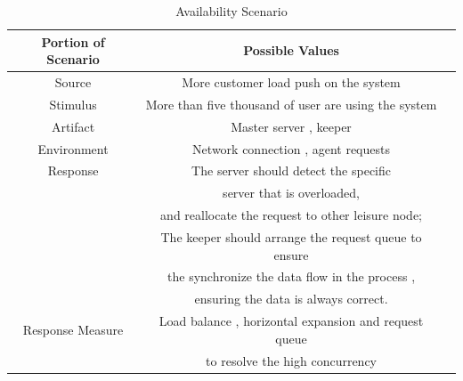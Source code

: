 \documentclass{article}
\begin{document}
	\begin{center}
		\begin{table}[!htb]
		\begin{tabular}{ccc}
		\toprule  
		Portion of Scenario & Possible Values\\
		\midrule 
		Source 				& More customer load push on the system\\
		Stimulus 			& More than five thousand of user are using the system\\
		Artifact 			& Master server , keeper\\
		Environment 		& Network connection , agent requests \\
		Response 			& The server should detect the specific \\
							& server that is overloaded, \\
							& and reallocate the request to other leisure node;\\
							& The keeper should arrange the request queue to ensure \\
							& the synchronize the data flow in the process ,\\
							& ensuring the data is always correct.\\
		Response Measure 	& Load balance , horizontal expansion and request queue \\
							& to resolve the high concurrency\\


		\bottomrule
		\end{tabular}
		\caption{Availability Scenario}
		\end{table}
	\end{center}
\end{document}
